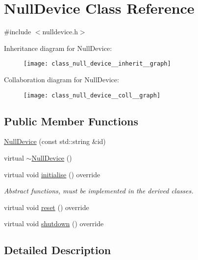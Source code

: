 \hypertarget{class_null_device}{}\section{Null\+Device Class Reference}
\label{class_null_device}


{\ttfamily \#include $<$nulldevice.\+h$>$}



Inheritance diagram for Null\+Device\+:\nopagebreak
\begin{figure}[H]
\begin{center}
\leavevmode
\texttt{[image: class\_null\_device\_\_inherit\_\_graph]}
\end{center}
\end{figure}


Collaboration diagram for Null\+Device\+:\nopagebreak
\begin{figure}[H]
\begin{center}
\leavevmode
\texttt{[image: class\_null\_device\_\_coll\_\_graph]}
\end{center}
\end{figure}
\subsection*{Public Member Functions}
\begin{DoxyCompactItemize}
\item 
\hyperlink{class_null_device_a0b5e08d3de90b7e61b58a1a417506749}{Null\+Device} (const std\+::string \&id)
\item 
virtual \hyperlink{class_null_device_ad7fe275a65c783a58606ac0ea92c51e3}{$\sim$\+Null\+Device} ()
\item 
virtual void \hyperlink{class_null_device_a1852663d61619d037dc02d8a657ceb80}{initialise} () override
\begin{DoxyCompactList}\small\item\em Abstract functions, must be implemented in the derived classes. \end{DoxyCompactList}\item 
virtual void \hyperlink{class_null_device_a20b19d5c07f540766311bf5e21cee927}{reset} () override
\item 
virtual void \hyperlink{class_null_device_a414a0c887b1edb54fa085d4ad2c50def}{shutdown} () override
\end{DoxyCompactItemize}


\subsection{Detailed Description}


